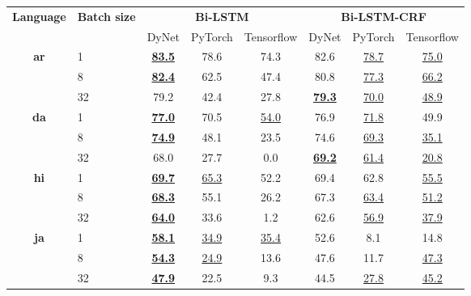 \begin{table}[h!]
    \centering
    \begin{tabular}{c l c c c|c c c}
        \toprule
        \multirow{2}{*}{\bfseries Language} &
        \multirow{2}{*}{\bfseries Batch size} &
        \multicolumn{3}{c}{\bfseries Bi-LSTM} &
        \multicolumn{3}{c}{\bfseries Bi-LSTM-CRF} \\
        \cmidrule(lr){3-8}
        && DyNet & PyTorch & Tensorflow & DyNet & PyTorch & Tensorflow \\

        \cmidrule(lr){1-8}
        \multirow{3}{*}{\bfseries ar}
        &  1 & 
        \underline{\textbf{83.5}} & 78.6 & 74.3 &
        82.6 & \underline{78.7} & \underline{75.0} \\
        &  8 & 
        \underline{\textbf{82.4}} & 62.5 & 47.4 &
        80.8 & \underline{77.3} & \underline{66.2} \\
        & 32 & 
        79.2 & 42.4 & 27.8 &
        \underline{\textbf{79.3}} & \underline{70.0} & \underline{48.9} \\

        \cmidrule(lr){1-8}
        \multirow{3}{*}{\bfseries da}
        &  1 &
        \underline{\textbf{77.0}} & 70.5 & \underline{54.0} &
        76.9 & \underline{71.8} & 49.9 \\
        &  8 &
        \underline{\textbf{74.9}} & 48.1 & 23.5 &
        74.6 & \underline{69.3} & \underline{35.1} \\
        & 32 &
        68.0 & 27.7 &  0.0 &
        \underline{\textbf{69.2}} & \underline{61.4} & \underline{20.8} \\

        \cmidrule(lr){1-8}
        \multirow{3}{*}{\bfseries hi}
        &  1 &
        \underline{\textbf{69.7}} & \underline{65.3} & 52.2 &
        69.4 & 62.8 & \underline{55.5} \\
        &  8 &
        \underline{\textbf{68.3}} & 55.1 & 26.2 &
        67.3 & \underline{63.4} & \underline{51.2} \\
        & 32 &
        \underline{\textbf{64.0}} & 33.6 &  1.2 &
        62.6 & \underline{56.9} & \underline{37.9} \\

        \cmidrule(lr){1-8}
        \multirow{3}{*}{\bfseries ja}
        &  1 &
        \underline{\textbf{58.1}} & \underline{34.9} & \underline{35.4} &
        52.6 &  8.1 & 14.8 \\
        &  8 &
        \underline{\textbf{54.3}} & \underline{24.9} & 13.6 &
        47.6 & 11.7 & \underline{47.3} \\
        & 32 &
        \underline{\textbf{47.9}} & 22.5 &  9.3 &
        44.5 & \underline{27.8} & \underline{45.2} \\


\end{tabular}
\end{table}
